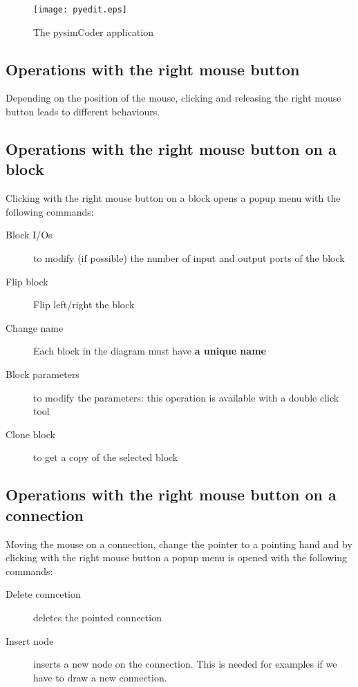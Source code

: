 \begin{figure}[htbp]
 \centering
 \texttt{[image: pyedit.eps]}
 \caption{The pysimCoder application}
 \label{Fig:pysimCoder}
 \end{figure}

\subsection{Operations with the right mouse button}
Depending on the position of the mouse, clicking and releasing the right mouse 
button leads to different behaviours.

\subsection{Operations with the right mouse button on a block}

Clicking with the right mouse button on a block opens a popup menu with the 
following commands:

\begin{description}
\item [Block I/Os] to modify (if possible) the number of input and output ports 
of the block
\item [Flip block] Flip left/right the block
\item [Change name] Each block in the diagram must have \textbf{a unique name}
\item [Block parameters] to modify the parameters: this operation is available 
with a double click tool
\item [Clone block] to get a copy of the selected block
\end{description}

\subsection{Operations with the right mouse button on a connection}

Moving the mouse on a connection, change the pointer to a pointing hand and by 
clicking with the right mouse button a popup menu is opened with the following 
commands:

\begin{description}
\item[Delete conncetion] deletes the pointed connection
\item [Insert node] inserts a new node on the connection. This is needed for 
examples if we have to draw a new connection.
\end{description}

